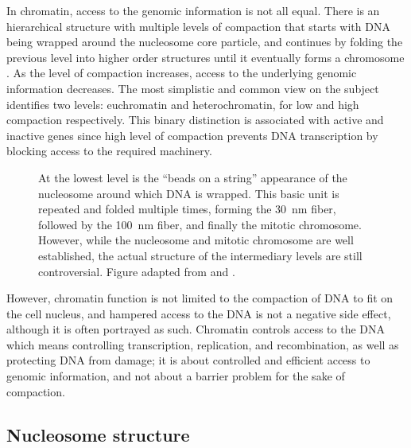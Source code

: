   In chromatin, access to the genomic information is not all equal.
  There is an hierarchical structure with
  multiple levels of compaction that starts with DNA being wrapped
  around the nucleosome core particle, and continues
  by folding the previous level into higher order structures
  until it eventually forms a chromosome .
  As the level of compaction increases, access to the underlying genomic
  information decreases.
  The most simplistic and common view on the subject
  identifies two levels: euchromatin and heterochromatin, for low and
  high compaction respectively.
  This binary distinction is associated with active and inactive genes
  since high level of compaction prevents DNA transcription by blocking
  access to the required machinery.

  \begin{figure}
    \centering
    \def\svgwidth{\textwidth}
                 {At the lowest level is the ``beads on a string''
                  appearance of the nucleosome around which DNA is
                  wrapped.  This basic unit is repeated and folded
                  multiple times, forming the \SI{30}{\nano\meter}
                  fiber, followed by the \SI{100}{\nano\meter} fiber,
                  and finally the mitotic chromosome.  However, while
                  the nucleosome and mitotic chromosome are well
                  established, the actual structure of the intermediary
                  levels are still controversial.
                  Figure adapted from \cite{alberts} and \cite{lodish}.}
    \label{fig:intro:chromatin-structure}
  \end{figure}

  However, chromatin function is not limited to the compaction of DNA
  to fit on the
  cell nucleus, and hampered access to the DNA is not a negative side
  effect, although it is often portrayed as such.
  Chromatin controls access
  to the DNA which means controlling transcription, replication,
  and recombination, as
  well as protecting DNA from damage;  it is about controlled and efficient
  access to genomic information, and not about a barrier problem for the sake
  of compaction.

  \subsection{Nucleosome structure}

